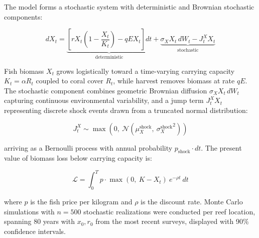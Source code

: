 \documentclass[10pt,letterpaper]{article}
\newcounter{metric}
\begin{document}
The model forms a stochastic system with deterministic and Brownian stochastic components:

\begin{equation}
dX_t = \underbrace{\left[ r X_t \left(1 - \frac{X_t}{K_t}\right) - qEX_t \right] dt}_{\text{deterministic}} + \underbrace{\sigma_X X_t \, dW_t - J_t^X X_t}_{\text{stochastic}}
\end{equation}

Fish biomass $X_t$ grows logistically toward a time-varying carrying capacity $K_t = \alpha R_t$ coupled to coral cover $R_t$, while harvest removes biomass at rate $qE$. The stochastic component combines geometric Brownian diffusion $\sigma_X X_t \, dW_t$ capturing continuous environmental variability, and a jump term $J_t^X X_t$ representing discrete shock events drawn from a truncated normal distribution:

\begin{equation}
J_t^X \sim \max\left(0,\ \mathcal{N}\!\left(\mu_X^{\text{shock}},\ {\sigma_X^{\text{shock}}}^2\right)\right)
\end{equation}

arriving as a Bernoulli process with annual probability $p_{\text{shock}} \cdot dt$. The present value of biomass loss below carrying capacity is:

\begin{equation}
\mathcal{L} = \int_0^T p \cdot \max(0,\ K - X_t)\ e^{-\rho t}\ dt
\label{biomass-loss}
\end{equation}

where $p$ is the fish price per kilogram and $\rho$ is the discount rate. Monte Carlo simulations with $n = 500$ stochastic realizations were conducted per reef location, spanning 80 years with $x_0, r_0$ from the most recent surveys, displayed with 90\% confidence intervals.
\end{document}
